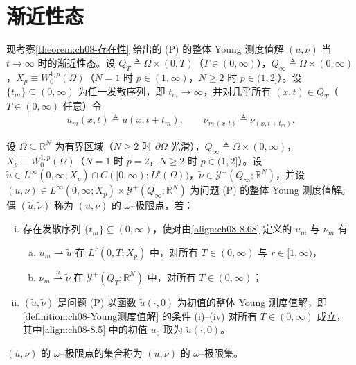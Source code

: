\documentclass[../../main.tex]{subfiles}%
\begin{document}
\section{渐近性态}\label{section:ch08-渐近性态}

现考察\cref{theorem:ch08-存在性} 给出的 (P) 的整体 Young 测度值解 $(u,\nu)$ 当 $t\to\infty$ 时的渐近性态。设 $Q_T\triangleq \Omega\times(0,T)$（$T\in(0,\infty)$），$Q_\infty\triangleq \Omega\times(0,\infty)$，$X_p\equiv W^{1,p}_0(\Omega)$（$N=1$ 时 $p\in(1,\infty)$，$N\geqslant2$ 时 $p\in(1,2]$）。设 $\{t_m\}\subseteq(0,\infty)$ 为任一发散序列，即 $t_m\to\infty$，并对几乎所有 $(x,t)\in Q_T$（$T\in(0,\infty)$ 任意）令
\begin{align}
u_m(x,t)\triangleq u(x,t+t_m),\qquad
\nu_{m\,(x,t)}\triangleq \nu_{(x,t+t_m)}. \label{align:ch08-8.68}
\end{align}

\begin{definition}\label{definition:ch08-omega极限点}
设 $\Omega\subseteq\mathbb{R}^N$ 为有界区域（$N\geqslant2$ 时 $\partial\Omega$ 光滑），$Q_\infty\triangleq\Omega\times(0,\infty)$，$X_p\equiv W^{1,p}_0(\Omega)$（$N=1$ 时 $p=2$，$N\geqslant2$ 时 $p\in(1,2]$）。设 $\tilde u\in L^\infty(0,\infty;X_p)\cap C([0,\infty);L^p(\Omega))$，$\tilde\nu\in\mathcal{Y}^+(Q_\infty;\mathbb{R}^N)$，并设 $(u,\nu)\in L^\infty(0,\infty;X_p)\times\mathcal{Y}^+(Q_\infty;\mathbb{R}^N)$ 为问题 (P) 的整体 Young 测度值解。偶 $(\tilde u,\tilde\nu)$ 称为 $(u,\nu)$ 的 $\omega$--极限点，若：
\begin{enumerate}[(i)]
\item\label{item:ch08-omega-i} 存在发散序列 $\{t_m\}\subseteq(0,\infty)$，使对由\eqref{align:ch08-8.68} 定义的 $u_m$ 与 $\nu_m$ 有
\begin{enumerate}[a)]
\item\label{item:ch08-omega-i-a} $u_m\rightharpoonup\tilde u$ 在 $L^r(0,T;X_p)$ 中，对所有 $T\in(0,\infty)$ 与 $r\in[1,\infty)$，
\item\label{item:ch08-omega-i-b} $\nu_m\stackrel{n}{\rightharpoonup}\tilde\nu$ 在 $\mathcal{Y}^+(Q_T;\mathbb{R}^N)$ 中，对所有 $T\in(0,\infty)$；
\end{enumerate}
\item\label{item:ch08-omega-ii} $(\tilde u,\tilde\nu)$ 是问题 (P) 以函数 $\tilde u(\cdot,0)$ 为初值的整体 Young 测度值解，即\cref{definition:ch08-Young测度值解} 的条件 (i)--(iv) 对所有 $T\in(0,\infty)$ 成立，其中\eqref{align:ch08-8.5} 中的初值 $u_0$ 取为 $\tilde u(\cdot,0)$。
\end{enumerate}
$(u,\nu)$ 的 $\omega$--极限点的集合称为 $(u,\nu)$ 的 $\omega$--极限集。
\end{definition}
\end{document}
